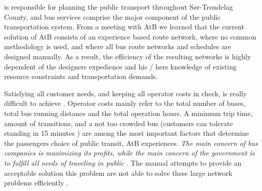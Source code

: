  \citet{website:atb} is responsible for planning the public transport throughout Sør-Trøndelag County, and bus services comprise the major component of the public transportation system. From a meeting with AtB we learned that the current solution of AtB consists of an experience based route network, where no common methodology is used, and where all bus route networks and schedules are designed manually. As a result, the efficiency of the resulting networks is highly dependent of the designers expedience and his / hers knowledge of existing resource constraints and transportation demands.

 Satisfying all customer needs, and keeping all operator costs in check, is really difficult to achieve \citep{kechagiopoulos14}. Operator costs mainly refer to the total number of buses, total bus running distance and the total operation hours. A minimum trip time, amount of transitions, and a not too crowded bus (customers can tolerate standing in 15 minutes ) are among the most important factors that determine the passengers choice of public transit, AtB experiences.  
 \textit{The main concern of bus companies is maximizing its profits, while the main concern of the government is to fulfill all needs of traveling in public} \citep{kechagiopoulos14}. The manual attempts to provide an acceptable solution this problem are not able to solve these large network problems efficiently \citep{kechagiopoulos14}. 
